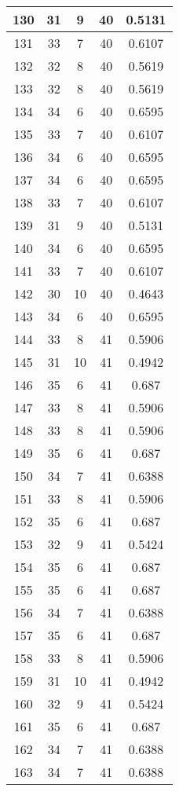 \documentclass[letterpaper, 12pt]{article}
\begin{document}
\begin{longtable}{|c|c|c|c|c|}
\hline
130 & 31 & 9 & 40 & 0.5131 \\
\hline
131 & 33 & 7 & 40 & 0.6107 \\
\hline
132 & 32 & 8 & 40 & 0.5619 \\
\hline
133 & 32 & 8 & 40 & 0.5619 \\
\hline
134 & 34 & 6 & 40 & 0.6595 \\
\hline
135 & 33 & 7 & 40 & 0.6107 \\
\hline
136 & 34 & 6 & 40 & 0.6595 \\
\hline
137 & 34 & 6 & 40 & 0.6595 \\
\hline
138 & 33 & 7 & 40 & 0.6107 \\
\hline
139 & 31 & 9 & 40 & 0.5131 \\
\hline
140 & 34 & 6 & 40 & 0.6595 \\
\hline
141 & 33 & 7 & 40 & 0.6107 \\
\hline
142 & 30 & 10 & 40 & 0.4643 \\
\hline
143 & 34 & 6 & 40 & 0.6595 \\
\hline
144 & 33 & 8 & 41 & 0.5906 \\
\hline
145 & 31 & 10 & 41 & 0.4942 \\
\hline
146 & 35 & 6 & 41 & 0.687 \\
\hline
147 & 33 & 8 & 41 & 0.5906 \\
\hline
148 & 33 & 8 & 41 & 0.5906 \\
\hline
149 & 35 & 6 & 41 & 0.687 \\
\hline
150 & 34 & 7 & 41 & 0.6388 \\
\hline
151 & 33 & 8 & 41 & 0.5906 \\
\hline
152 & 35 & 6 & 41 & 0.687 \\
\hline
153 & 32 & 9 & 41 & 0.5424 \\
\hline
154 & 35 & 6 & 41 & 0.687 \\
\hline
155 & 35 & 6 & 41 & 0.687 \\
\hline
156 & 34 & 7 & 41 & 0.6388 \\
\hline
157 & 35 & 6 & 41 & 0.687 \\
\hline
158 & 33 & 8 & 41 & 0.5906 \\
\hline
159 & 31 & 10 & 41 & 0.4942 \\
\hline
160 & 32 & 9 & 41 & 0.5424 \\
\hline
161 & 35 & 6 & 41 & 0.687 \\
\hline
162 & 34 & 7 & 41 & 0.6388 \\
\hline
163 & 34 & 7 & 41 & 0.6388 \\

\end{longtable}
\end{document}
